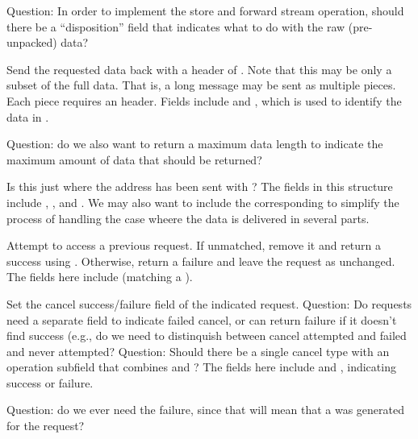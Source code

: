 \documentclass{article}
\begin{document}
\begin{tcp}
\begin{description}
Question: In order to implement the store and forward stream
operation, should there be a ``disposition'' field that indicates what
to do with the raw (pre-unpacked) data?

\item[\mpidconst{MPID_Hid_ok_to_send}.]Send the requested data back
with a header of .  Note that this may be
only a subset of the full data.  That is, a long message may be sent
as multiple pieces.  Each piece requires an 
header.
Fields include  and
, which is used to identify the
data in .  

Question: do we also want to return a maximum data length to indicate
the maximum amount of data that should be returned?

\item[\mpidconst{MPID_Hid_data}.]Is this just 
where the address has been sent with ?
The fields in this structure include ,
, and .  We may
also want to include the corresponding
 to simplify the process of handling
the case wheere the data is delivered in several parts.

\item[\mpidconst{MPID_Hid_cancel}.]Attempt to access a previous
request.  If unmatched, remove it and return a success
 using .
Otherwise, return a failure and leave the request as unchanged.
The fields here include  (matching
a ).

\item[\mpidconst{MPID_Hid_cancel_ack}.]Set the cancel success/failure
field of the indicated request.  Question: Do requests need a separate
field to indicate failed cancel, or can 
return failure if it doesn't find success (e.g., do we need to
distinquish between cancel attempted and failed and never attempted?
Question: Should there be a single cancel type with an operation
subfield that combines  and
?
The fields here include  and
, indicating success or failure.

Question: do we ever need the failure, since that will mean that a
 was generated for the request?


\end{description}
\end{tcp}
\end{document}
